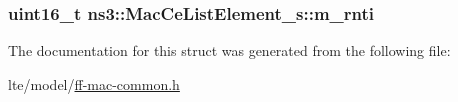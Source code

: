 \subsubsection[{\texorpdfstring{m\+\_\+rnti}{m_rnti}}]{\setlength{\rightskip}{0pt plus 5cm}uint16\+\_\+t ns3\+::\+Mac\+Ce\+List\+Element\+\_\+s\+::m\+\_\+rnti}\hypertarget{structns3_1_1MacCeListElement__s_a4fe0e279b290f76f9affb6f9d52ae239}{}\label{structns3_1_1MacCeListElement__s_a4fe0e279b290f76f9affb6f9d52ae239}


The documentation for this struct was generated from the following file\+:\begin{DoxyCompactItemize}
\item 
lte/model/\hyperlink{ff-mac-common_8h}{ff-\/mac-\/common.\+h}\end{DoxyCompactItemize}
